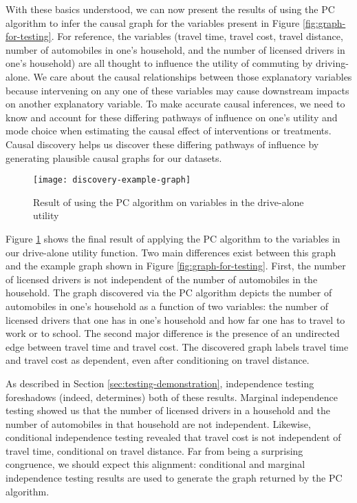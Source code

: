 With these basics understood, we can now present the results of using the PC algorithm to infer the causal graph for the variables present in Figure \ref{fig:graph-for-testing}.
For reference, the variables (travel time, travel cost, travel distance, number of automobiles in one's household, and the number of licensed drivers in one's household) are all thought to influence the utility of commuting by driving-alone.
We care about the causal relationships between those explanatory variables because intervening on any one of these variables may cause downstream impacts on another explanatory variable.
To make accurate causal inferences, we need to know and account for these differing pathways of influence on one's utility and mode choice when estimating the causal effect of interventions or treatments.
Causal discovery helps us discover these differing pathways of influence by generating plausible causal graphs for our datasets.

\begin{figure}
   \centering
   \texttt{[image: discovery-example-graph]}
   \caption{Result of using the PC algorithm on variables in the drive-alone utility}
   \label{fig:discovery-example-graph}
\end{figure}

Figure \ref{fig:discovery-example-graph} shows the final result of applying the PC algorithm to the variables in our drive-alone utility function.
Two main differences exist between this graph and the example graph shown in Figure \ref{fig:graph-for-testing}.
First, the number of licensed drivers is not independent of the number of automobiles in the household.
The graph discovered via the PC algorithm depicts the number of automobiles in one's household as a function of two variables: the number of licensed drivers that one has in one's household and how far one has to travel to work or to school.
The second major difference is the presence of an undirected edge between travel time and travel cost.
The discovered graph labels travel time and travel cost as dependent, even after conditioning on travel distance.

As described in Section \ref{sec:testing-demonstration}, independence testing foreshadows (indeed, determines) both of these results.
Marginal independence testing showed us that the number of licensed drivers in a household and the number of automobiles in that household are not independent.
Likewise, conditional independence testing revealed that travel cost is not independent of travel time, conditional on travel distance.
Far from being a surprising congruence, we should expect this alignment: conditional and marginal independence testing results are used to generate the graph returned by the PC algorithm.

